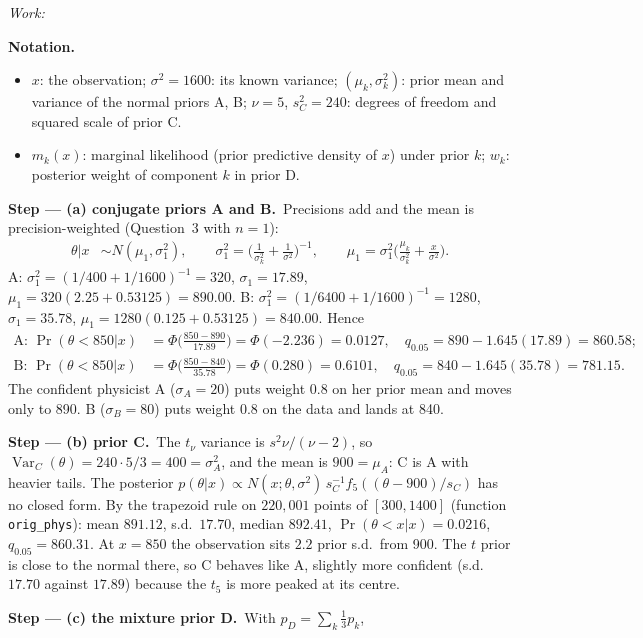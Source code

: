 \documentclass[11pt,a4paper]{article}
\newif\ifsolucoes
\newcommand{\espacoresol}{4.5cm}   %
\newenvironment{notacao}{\par\smallskip\noindent\textbf{Notation.}\begin{itemize}[leftmargin=1.4em,topsep=1pt,itemsep=0pt]\small}{\end{itemize}}
\newcommand{\resolespaco}{\ifsolucoes\else\par\textit{Work:}\vspace{\espacoresol}\par\fi}
\newcommand{\passo}[2]{\par\smallskip\noindent\textbf{Step --- #1.}~#2}
\begin{document}
\resolespaco
\begin{sol}
\begin{notacao}
\item $x$: the observation; $\sigma^2=1600$: its known variance; $(\mu_k,\sigma_k^2)$: prior mean and variance of the normal priors A, B; $\nu=5$, $s_C^2=240$: degrees of freedom and squared scale of prior C.
\item $m_k(x)$: marginal likelihood (prior predictive density of $x$) under prior $k$; $w_k$: posterior weight of component $k$ in prior D.
\end{notacao}
\passo{(a) conjugate priors A and B}{Precisions add and the mean is precision-weighted (Question~3 with $n=1$):
\begin{align}
\theta|x&\sim N(\mu_1,\sigma_1^2),\qquad\sigma_1^2=\Big(\frac1{\sigma_k^2}+\frac1{\sigma^2}\Big)^{-1},\qquad\mu_1=\sigma_1^2\Big(\frac{\mu_k}{\sigma_k^2}+\frac{x}{\sigma^2}\Big).\label{o5:conj}
\end{align}
A: $\sigma_1^2=(1/400+1/1600)^{-1}=320$, $\sigma_1=17.89$, $\mu_1=320(2.25+0.53125)=890.00$. B: $\sigma_1^2=(1/6400+1/1600)^{-1}=1280$, $\sigma_1=35.78$, $\mu_1=1280(0.125+0.53125)=840.00$. Hence
\begin{align}
\text{A: }\Pr(\theta<850|x)&=\Phi\Big(\frac{850-890}{17.89}\Big)=\Phi(-2.236)=0.0127,\quad q_{0.05}=890-1.645(17.89)=860.58;\label{o5:A}\\
\text{B: }\Pr(\theta<850|x)&=\Phi\Big(\frac{850-840}{35.78}\Big)=\Phi(0.280)=0.6101,\quad q_{0.05}=840-1.645(35.78)=781.15.\label{o5:B}
\end{align}
The confident physicist A ($\sigma_A=20$) puts weight $0.8$ on her prior mean and moves only to 890. B ($\sigma_B=80$) puts weight $0.8$ on the data and lands at 840.}
\passo{(b) prior C}{The $t_\nu$ variance is $s^2\nu/(\nu-2)$, so $\operatorname{Var}_C(\theta)=240\cdot5/3=400=\sigma_A^2$, and the mean is $900=\mu_A$: C is A with heavier tails. The posterior $p(\theta|x)\propto N(x;\theta,\sigma^2)\,s_C^{-1}f_5((\theta-900)/s_C)$ has no closed form. By the trapezoid rule on $220{,}001$ points of $[300,1400]$ (function \texttt{orig\_phys}): mean $891.12$, s.d.\ $17.70$, median $892.41$, $\Pr(\theta<x|x)=0.0216$, $q_{0.05}=860.31$. At $x=850$ the observation sits $2.2$ prior s.d.\ from 900. The $t$ prior is close to the normal there, so C behaves like A, slightly more confident (s.d.\ $17.70$ against $17.89$) because the $t_5$ is more peaked at its centre.}
\passo{(c) the mixture prior D}{With $p_D=\sum_k\frac13p_k$,
\begin{align}

\end{align}}
\end{sol}
\end{document}
